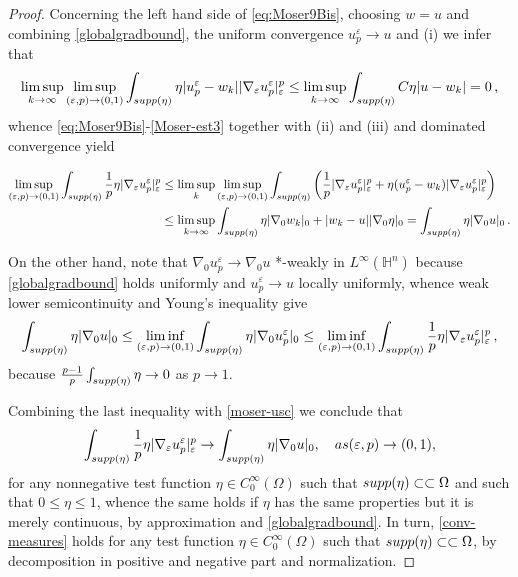 \documentclass[10pt]{amsart}
\numberwithin{equation}{section}
\theoremstyle{definition}
\newcommand{\He}{\mathbb{H}}
\begin{document}
\begin{proof}
Concerning the left hand side of \eqref{eq:Moser9Bis}, choosing $w=u$ and combining \eqref{globalgradbound}, the uniform convergence $u_p^\varepsilon \to u$ and (i) we infer that
\[ \limsup_{k \to \infty }\limsup_{(\varepsilon, p) \to (0,1)} \int_{\rm{supp}(\eta)}\eta |u_{p}^{\varepsilon}-w_k| |\nabla_{\varepsilon}u_{p}^{\varepsilon}|_{\varepsilon}^{p}  \leq  \limsup_{k \to \infty }   \int_{\rm{supp}(\eta)} C \eta |u-w_k| =0 \, ,\]
whence \eqref{eq:Moser9Bis}-\eqref{Moser-est3} together with (ii) and (iii) and dominated convergence yield

\begin{equation}\label{moser-usc}
\begin{aligned}
 \limsup_{(\varepsilon, p) \to (0,1)} \int_{\rm{supp}(\eta)}  \dfrac{1}{p}\eta |\nabla_{\varepsilon}u_{p}^{\varepsilon}|_{\varepsilon}^{p} 
 & \leq \limsup_k    \limsup_{(\varepsilon, p) \to (0,1)} 
 \int_{\rm{supp}(\eta)} \left( \dfrac{1}{p}|\nabla_{\varepsilon}u_{p}^{\varepsilon}|_{\varepsilon}^{p} + \eta (u_{p}^{\varepsilon}-w_k) |\nabla_{\varepsilon}u_{p}^{\varepsilon}|_{\varepsilon}^{p}\right) \\
& \leq \limsup_{k \to \infty } \int_{\rm{supp}(\eta)}\eta |\nabla_{0}w_k|_{0} 
+|w_k-u| |\nabla_{0}\eta|_{0}=\int_{\rm{supp}(\eta)}\eta |\nabla_{0} u|_{0} \, .
\end{aligned}
\end{equation}



On the other hand, note that $\nabla_0 u_p^\varepsilon \to \nabla_0 u$ *-weakly in $L^\infty (\He^n)$ because \eqref{globalgradbound} holds uniformly and $u^\varepsilon_p \to u$ locally uniformly, whence weak lower semicontinuity and Young's inequality give
\[ \int_{\rm{supp}(\eta)}\eta |\nabla_{0} u|_{0} \leq \liminf_{(\varepsilon, p) \to (0,1)} \int_{\rm{supp}(\eta)}\eta |\nabla_{0} u_p^\varepsilon|_{0} \leq \liminf_{(\varepsilon, p) \to (0,1)} \int_{\rm{supp}(\eta)} \dfrac{1}{p}\eta |\nabla_{\varepsilon}u_{p}^{\varepsilon}|_{\varepsilon}^{p} \, , \]
because $ \frac{p-1}{p} \int_{\rm{supp}(\eta)}  \eta \to 0$ as $p \to 1$.

Combining the last inequality with \eqref{moser-usc} we conclude that
\begin{equation}
\label{conv-measures}
\int_{\rm{supp}(\eta)} \dfrac{1}{p} \eta |\nabla_{\varepsilon}u_{p}^{\varepsilon}|_{\varepsilon}^{p} \to \int_{\rm{supp}(\eta)}\eta |\nabla_{0}u|_{0}, \quad \textrm{as } (\varepsilon, p) \to (0,1),
\end{equation}
\noindent  for any nonnegative test function $\eta \in C^{\infty}_{0}(\Omega)$ such that $\rm{supp}(\eta)\subset\subset \Omega$  and such that $0 \leq \eta \leq 1$, whence the same holds if $\eta$ has the same properties but it is merely continuous, by approximation and \eqref{globalgradbound}. In turn, \eqref{conv-measures} holds for any  test function $\eta \in C^{\infty}_{0}(\Omega)$ such that $\rm{supp}(\eta)\subset\subset \Omega$, by decomposition in positive and negative part and normalization.


\end{proof}
\end{document}
